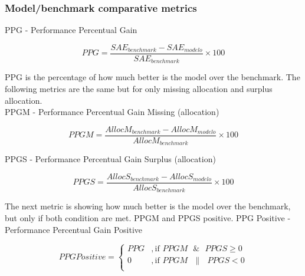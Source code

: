 \subsubsection{Model/benchmark comparative metrics}

PPG - Performance Percentual Gain
\begin{linenomath}
    \begin{equation}\label{eq:PPG}
        PPG = \frac{SAE_{benchmark} - SAE_{modelo}}{SAE_{benchmark}} \times 100
    \end{equation}
    \end{linenomath}
PPG is the percentage of how much better is the model over the benchmark. The following metrics are the same but for only missing allocation and surplus allocation.\\
PPGM - Performance Percentual Gain Missing (allocation)\\
\begin{linenomath}
    \begin{equation}\label{eq:PPGM}
        PPGM = \frac{AllocM_{benchmark} - AllocM_{modelo}}{AllocM_{benchmark}} \times 100
    \end{equation}
    \end{linenomath}
PPGS - Performance Percentual Gain Surplus (allocation)\\
\begin{linenomath}
    \begin{equation}\label{eq:PPGS}
        PPGS = \frac{AllocS_{benchmark} - AllocS_{modelo}}{AllocS_{benchmark}} \times 100
    \end{equation}
    \end{linenomath}

The next metric is showing how much better is the model over the benchmark, but only if both condition are met. PPGM and PPGS positive.
PPG Positive  - Performance Percentual Gain Positive
\begin{linenomath}
    \begin{equation}\label{eq:PPGPositive}
        PPG Positive = 
        \begin{cases} 
            PPG & , \text{if } PPGM \text{ }\&\text{ } PPGS \geq 0 \\
            0 & , \text{if } PPGM \text{ }\|\text{ } PPGS < 0 \\
        \end{cases} 
        \end{equation}
    \end{linenomath}
